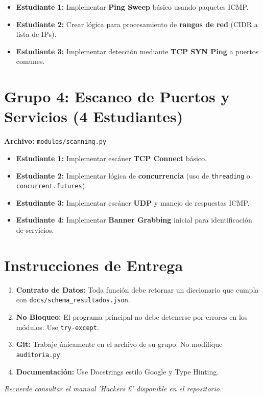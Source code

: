 \documentclass[12pt,a4paper]{article}
\begin{document}
\begin{itemize}[label=$\bullet$]
    \item \textbf{Estudiante 1:} Implementar \textbf{Ping Sweep} básico usando paquetes ICMP.
    \item \textbf{Estudiante 2:} Crear lógica para procesamiento de \textbf{rangos de red} (CIDR a lista de IPs).
    \item \textbf{Estudiante 3:} Implementar detección mediante \textbf{TCP SYN Ping} a puertos comunes.
\end{itemize}

\section{Grupo 4: Escaneo de Puertos y Servicios (4 Estudiantes)}
\textbf{Archivo:} \texttt{modulos/scanning.py}

\begin{itemize}[label=$\bullet$]
    \item \textbf{Estudiante 1:} Implementar escáner \textbf{TCP Connect} básico.
    \item \textbf{Estudiante 2:} Implementar lógica de \textbf{concurrencia} (uso de \texttt{threading} o \texttt{concurrent.futures}).
    \item \textbf{Estudiante 3:} Implementar escáner \textbf{UDP} y manejo de respuestas ICMP.
    \item \textbf{Estudiante 4:} Implementar \textbf{Banner Grabbing} inicial para identificación de servicios.
\end{itemize}

\section{Instrucciones de Entrega}
\begin{enumerate}
    \item \textbf{Contrato de Datos:} Toda función debe retornar un diccionario que cumpla con \texttt{docs/schema\_resultados.json}.
    \item \textbf{No Bloqueo:} El programa principal no debe detenerse por errores en los módulos. Use \texttt{try-except}.
    \item \textbf{Git:} Trabaje únicamente en el archivo de su grupo. No modifique \texttt{auditoria.py}.
    \item \textbf{Documentación:} Use Docstrings estilo Google y Type Hinting.
\end{enumerate}

\vfill
\centering
\textit{Recuerde consultar el manual 'Hackers 6' disponible en el repositorio.}
\end{document}
